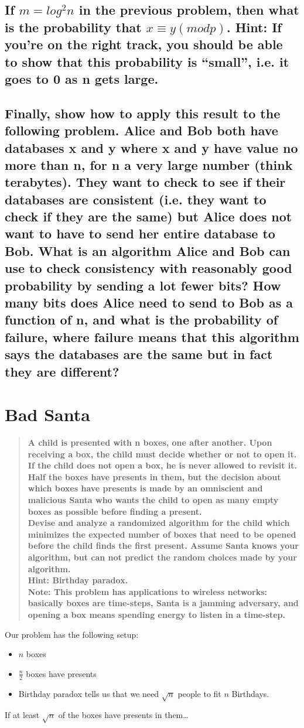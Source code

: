 \documentclass[titlepage]{article}\usepackage[]{graphicx}\usepackage[]{color}
\begin{document}
\subsection{ If $ m = log^2 n$  in the previous problem, then what is the probability that
$x ≡ y (mod p)$. Hint: If you're on the right track, you should be able to show
that this probability is ``small'', i.e. it goes to 0 as n gets large. }

\subsection{ Finally, show how to apply this result to the following problem. Alice and
Bob both have databases x and y where x and y have value no more than n, for n
a very large number (think terabytes). They want to check to see if their
databases are consistent (i.e. they want to check if they are the same) but
Alice does not want to have to send her entire database to Bob. What is an
algorithm Alice and Bob can use to check consistency with reasonably good
probability by sending a lot fewer bits? How many bits does Alice need to send
to Bob as a function of n, and what is the probability of failure, where
failure means that this algorithm says the databases are the same but in fact
they are different? }


\section{Bad Santa }
\begin{quote}
	\textbf{
		A child is presented with n boxes, one after another. Upon receiving
		a box, the child must decide whether or not to open it. If the child does not
		open a box, he is never allowed to revisit it. Half the
		boxes have presents in them, but the decision about which boxes have presents
		is made by an omniscient and malicious Santa who wants the child to open as
		many empty boxes as possible before finding a present. \\ 
		Devise and analyze a randomized algorithm for the child which minimizes the
		expected number of boxes that need to be opened before the child finds the
		first present. Assume Santa knows your algorithm, but can not predict the
		random choices made by your algorithm. \\ 
		Hint: Birthday paradox. \\
		Note: This problem has applications to wireless networks: basically boxes are
		time-steps, Santa is a jamming adversary, and opening a box means spending
	energy to listen in a time-step.}
\end{quote}

Our problem has the following setup:

\begin{itemize}
	\item $n$ boxes
	\item $\frac{n}{2}$ boxes have presents
	\item Birthday paradox tells us that we need $\sqrt{n}$ people to fit
		$n$ Birthdays. 
\end{itemize}

If at least $\sqrt{n}$ of the boxes have presents in them\dots
\end{document}
